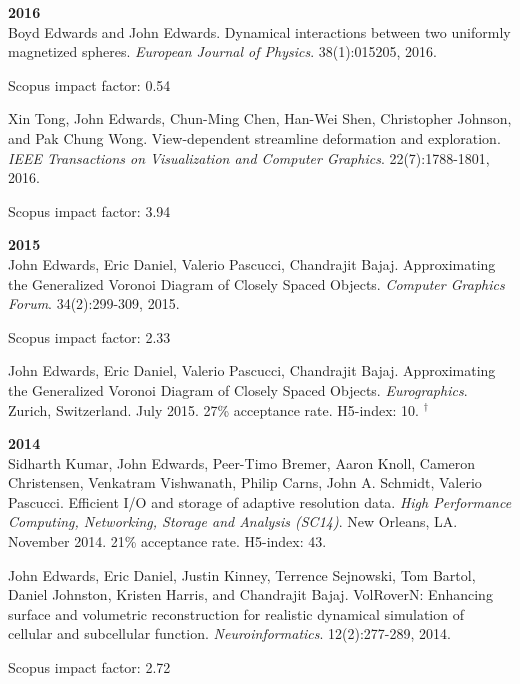 \documentclass[margin,line]{res}
\newcommand{\pubunder}[1]{#1}
\begin{document}
\begin{resume}
\textbf{2016} \\
Boyd Edwards and \pubunder{John Edwards}. Dynamical interactions between two uniformly magnetized spheres. \textit{European Journal of Physics}. 38(1):015205, 2016.
\begin{IMPACT}
Scopus impact factor: 0.54 %
\end{IMPACT}

Xin Tong, \pubunder{John Edwards}, Chun-Ming Chen, Han-Wei Shen, Christopher Johnson, and Pak Chung Wong. View-dependent streamline deformation and exploration. \textit{IEEE Transactions on Visualization and Computer Graphics}. 22(7):1788-1801, 2016.
\begin{IMPACT}
Scopus impact factor: 3.94 %
\end{IMPACT}

\textbf{2015} \\
\pubunder{John Edwards}, Eric Daniel, Valerio Pascucci, Chandrajit Bajaj. Approximating the Generalized Voronoi Diagram of Closely Spaced Objects. \textit{Computer Graphics Forum}. 34(2):299-309, 2015.
\begin{IMPACT}
Scopus impact factor: 2.33 %
\end{IMPACT}

\pubunder{John Edwards}, Eric Daniel, Valerio Pascucci, Chandrajit Bajaj. Approximating the Generalized Voronoi Diagram of Closely Spaced Objects. \textit{Eurographics}. Zurich, Switzerland. July 2015. 27\% acceptance rate. H5-index: 10.
$^\dagger$

\textbf{2014} \\
Sidharth Kumar, \pubunder{John Edwards}, Peer-Timo Bremer, Aaron Knoll, Cameron Christensen, Venkatram Vishwanath, Philip Carns, John A. Schmidt, Valerio Pascucci. Efficient I/O and storage of adaptive resolution data. \textit{High Performance Computing, Networking, Storage and Analysis (SC14)}. New Orleans, LA. November 2014. 21\% acceptance rate. H5-index: 43.

\pubunder{John Edwards}, Eric Daniel, Justin Kinney, Terrence Sejnowski, Tom Bartol, Daniel Johnston, Kristen Harris, and Chandrajit Bajaj. VolRoverN: Enhancing surface and volumetric reconstruction for realistic dynamical simulation of cellular and subcellular function.  \textit{Neuroinformatics}. 12(2):277-289, 2014.
\begin{IMPACT}
Scopus impact factor: 2.72 %
\end{IMPACT}


\end{resume}
\end{document}
